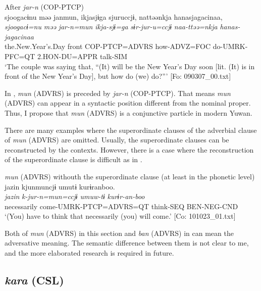 \begin{xlist}
\ea\label{ex:10.32}   After \textit{jar-n} (COP-PTCP)\\
      \glll    sjoogacɨnu  məə  janmun,  ikjasjɨga  sjuruccjɨ,  nattəənkja  hanasjagacinaa,\\
    \textit{sjoogacɨ=nu}  \textit{məə}  \textit{jar-n=mun}  \textit{ikja-sjɨ=ga}   \textit{sɨr-jur-u=ccjɨ}  \textit{naa-ttəə=nkja}  \textit{hanas-jagacinaa}\\
    the.New.Year’s.Day  front  COP-PTCP=ADVRS  how-ADVZ=FOC  do-UMRK-PFC=QT  2.HON-DU=APPR  talk-SIM\\
    \glt     ‘The couple was saying that, “(It) will be the New Year’s Day soon [lit. (It) is in front of the New Year’s Day], but how do (we) do?”’ [Fo: 090307\_00.txt]
\z

In , \textit{mun} (ADVRS) is preceded by \textit{jar-n} (COP-PTCP). That means \textit{mun} (ADVRS) can appear in a syntactic position different from the nominal proper. Thus, I propose that \textit{mun} (ADVRS) is a conjunctive particle in modern Yuwan.

  There are many examples where the superordinate clauses of the adverbial clause of \textit{mun} (ADVRS) are omitted. Usually, the superordinate clauses can be reconstructed by the contexts. However, there is a case where the reconstruction of the superordinate clause is difficult as in .

\ea\label{ex:10.33}   \textit{mun} (ADVRS) withouth the superordinate clause (at least in the phonetic level)\\
      \glll    jazin  kjunmuncjɨ  umutɨ  kurɨranboo.\\
    \textit{jazin}  \textit{k-jur-n=mun=ccjɨ}  \textit{umuw-tɨ}  \textit{kurɨr-an-boo}\\
    necessarily  come-UMRK-PTCP=ADVRS=QT  think-SEQ  BEN-NEG-CND\\
\glt     ‘(You) have to think that necessarily (you) will come.’  [Co: 101023\_01.txt]
\z

Both of \textit{mun} (ADVRS) in this section and \textit{ban} (ADVRS) in  can mean the adversative meaning. The semantic difference between them is not clear to me, and the more elaborated research is required in future.

\subsection{\textit{kara} (CSL)}\label{sec:10.2.3}


\end{xlist}

